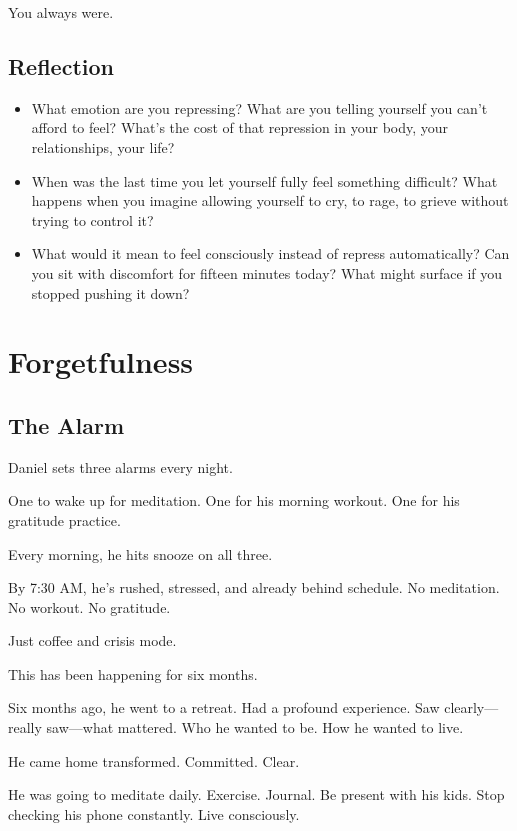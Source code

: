 \documentclass[11pt,twoside]{book}
\begin{document}
You always were.

\section*{Reflection}

\begin{itemize}
\item What emotion are you repressing? What are you telling yourself you can't afford to feel? What's the cost of that repression in your body, your relationships, your life?
\item When was the last time you let yourself fully feel something difficult? What happens when you imagine allowing yourself to cry, to rage, to grieve without trying to control it?
\item What would it mean to feel consciously instead of repress automatically? Can you sit with discomfort for fifteen minutes today? What might surface if you stopped pushing it down?
\end{itemize}

\chapter{Forgetfulness}

\section*{The Alarm}

Daniel sets three alarms every night.

One to wake up for meditation. One for his morning workout. One for his gratitude practice.

Every morning, he hits snooze on all three.

By 7:30 AM, he's rushed, stressed, and already behind schedule. No meditation. No workout. No gratitude.

Just coffee and crisis mode.

This has been happening for six months.

Six months ago, he went to a retreat. Had a profound experience. Saw clearly—really saw—what mattered. Who he wanted to be. How he wanted to live.

He came home transformed. Committed. Clear.

He was going to meditate daily. Exercise. Journal. Be present with his kids. Stop checking his phone constantly. Live consciously.
\end{document}
